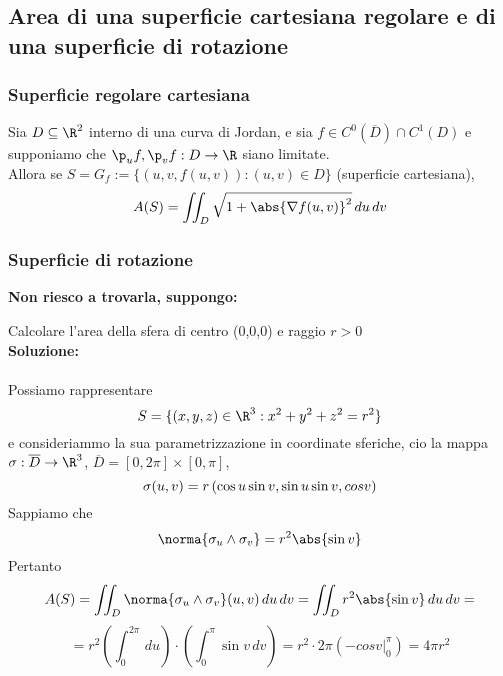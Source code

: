 \subsection{Area di una superficie cartesiana regolare e di una superficie di rotazione}
\subsubsection{Superficie regolare cartesiana}
\begin{definition}
  Sia $D\subseteq\R^2$ interno di una curva di Jordan, e sia 
  $f\in C^0(\overline{D})\cap C^1(D)$ e supponiamo che 
  $\p_u f, \p_v f : D \to \R$ siano limitate. \\
  Allora se $S = G_f := \{(u,v,f(u,v)):(u,v)\in D\}$ (superficie cartesiana), 
  $$A(S) = \iint_{D} \sqrt{1+\abs{\nabla f(u,v)}^2} \,du \,dv$$
\end{definition}
\subsubsection{Superficie di rotazione}
\textbf{Non riesco a trovarla, suppongo:}
\begin{definition}
  Calcolare l'area della sfera di centro (0,0,0) e raggio $r>0$ \\
  \textbf{Soluzione:} \\\\
  Possiamo rappresentare 
  $$S = \{(x,y,z)\in\R^3:x^2+y^2+z^2 = r^2\}$$
  e consideriammo la sua parametrizzazione in coordinate sferiche, cio\ace 
  la mappa $\sigma:\overline{D}\to\R^3$, $\overline{D}=[0,2\pi]\times[0,\pi]$, 
  $$\sigma(u,v) = r\left(\cos{u}\sin{v}, \sin{u}\sin{v}, \\cos{v}\right)$$
  Sappiamo che $$\norma{\sigma_u\wedge\sigma_v} = r^2\abs{\sin{v}}$$
  Pertanto 
  $$A(S) = \iint_{D} \norma{\sigma_u\wedge\sigma_v} (u,v) \,du\,dv = \iint_{D} r^2\abs{\sin{v}} \,du\,dv = $$
  $$= r^2\left(\int_{0}^{2\pi} \,du\right)\cdot\left(\int_{0}^{\pi}\sin{v} \,dv\right) = 
      r^2\cdot 2\pi \left(\left.-cos{v}\right|_{0}^{\pi}\right) = 4\pi r^2$$
\end{definition}